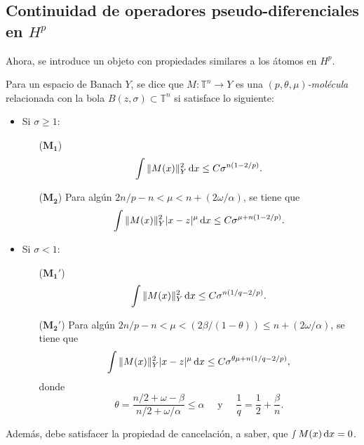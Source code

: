 \subsection{Continuidad de operadores pseudo-diferenciales en $H^p$}
Ahora, se introduce un objeto con propiedades similares a los átomos en $H^p$.
\begin{definition}[Molécula]\label{def:molecule}
	Para un espacio de Banach $Y$, se dice que $M:\mathbb{T}^n\rightarrow Y$ es una \textit{$(p, \theta, \mu)$-molécula} relacionada con la bola $B(z, \sigma) \subset \mathbb{T}^n$ si satisface lo siguiente:
	\begin{itemize}
		\item Si $\sigma \geq 1$:
		\begin{itemize}
			\item[($\mathbf{M_1}$)] \begin{equation*}
				\int \|M(x)\|_Y^2\mathop{}\!\mathrm{d} x \leq C \sigma^{n(1-2/p)}.
			\end{equation*}
			\item[($\mathbf{M_2}$)] Para algún $2n/p-n < \mu < n + (2\omega/\alpha)$, se tiene que
			\begin{equation*}
				\int \|M(x)\|_Y^2|x-z|^\mu \mathop{}\!\mathrm{d} x \leq C \sigma^{\mu + n(1-2/p)}.
			\end{equation*}
		\end{itemize}
		\item Si $\sigma < 1$:
		\begin{itemize}
			\item[($\mathbf{M_1'}$)] \begin{equation*}
				\int \|M(x)\|_Y^2\mathop{}\!\mathrm{d} x \leq C \sigma^{n(1/q-2/p)}.
			\end{equation*}
			\item[($\mathbf{M_2'}$)] Para algún $2n/p-n < \mu < (2\beta/(1-\theta)) \leq n + (2\omega/\alpha)$, se tiene que
			\begin{equation*}
				\int \|M(x)\|_Y^2|x-z|^\mu \mathop{}\!\mathrm{d} x \leq C \sigma^{\theta\mu + n(1/q-2/p)}, 
			\end{equation*}
			donde 
			\begin{equation*}
				\theta = \frac{n/2 + \omega - \beta}{n/2+\omega/\alpha}\leq \alpha \quad \text{ y } \quad \frac{1}{q} = \frac{1}{2} + \frac{\beta}{n}.
			\end{equation*}
		\end{itemize}
	\end{itemize}
	Además, debe satisfacer la propiedad de cancelación, a saber, que $\smallint M(x)\mathop{}\!\mathrm{d} x = 0$.
\end{definition}
